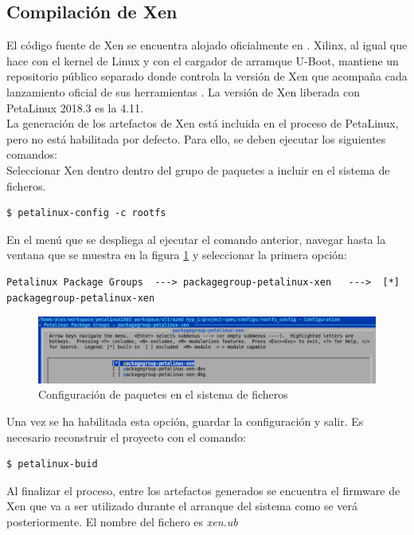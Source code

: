 \subsection{Compilación de Xen}

El código fuente de Xen se encuentra alojado oficialmente en \cite{xen_source}. Xilinx, al igual que hace con el kernel de Linux y con el cargador de arramque U-Boot, mantiene un repositorio público separado donde controla la versión de Xen que acompaña cada lanzamiento oficial de sus herramientas \cite{xen_source_xilinx}. La versión de Xen liberada con PetaLinux 2018.3 es la 4.11.\\
La generación de los artefactos de Xen está incluida en el proceso de PetaLinux, pero no está habilitada por defecto. Para ello, se deben ejecutar los siguientes comandos:\\
Seleccionar Xen dentro dentro del grupo de paquetes a incluir en el sistema de ficheros.
\begin{lstlisting}[style=CStyle]
$ petalinux-config -c rootfs
\end{lstlisting}

En el menú que se despliega al ejecutar el comando anterior, navegar hasta la ventana que se muestra en la figura \ref{fig:xen_menuconfig_1} y seleccionar la primera opción:
\begin{lstlisting}[style=CStyle]
Petalinux Package Groups  ---> packagegroup-petalinux-xen   --->  [*] packagegroup-petalinux-xen
\end{lstlisting}

\begin{figure}[!h]
  \centering
  \includegraphics[width=1.0\textwidth]{recursos/petalinux_xen_1.png}
  \caption{Configuración de paquetes en el sistema de ficheros}
  \label{fig:xen_menuconfig_1}
\end{figure}

Una vez se ha habilitada esta opción, guardar la configuración y salir. Es necesario reconstruir el proyecto con el comando:
\begin{lstlisting}[style=CStyle]
$ petalinux-buid
\end{lstlisting}

Al finalizar el proceso, entre los artefactos generados se encuentra el firmware de Xen que va a ser utilizado durante el arranque del sistema como se verá posteriormente. El nombre del fichero es \textit{xen.ub}


